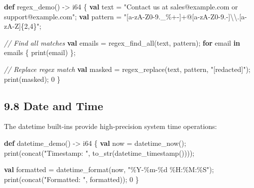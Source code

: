 \documentclass[
  english,
]{book}
\newenvironment{Shaded}{\begin{snugshade}}{\end{snugshade}}
\newcommand{\CommentTok}[1]{\textcolor[rgb]{0.42,0.60,0.33}{\textit{#1}}}
\newcommand{\ControlFlowTok}[1]{\textcolor[rgb]{0.77,0.53,0.75}{\textbf{#1}}}
\newcommand{\DataTypeTok}[1]{\textcolor[rgb]{0.31,0.79,0.69}{#1}}
\newcommand{\DecValTok}[1]{\textcolor[rgb]{0.71,0.81,0.66}{#1}}
\newcommand{\FunctionTok}[1]{\textcolor[rgb]{0.86,0.86,0.67}{#1}}
\newcommand{\KeywordTok}[1]{\textcolor[rgb]{0.34,0.61,0.84}{\textbf{#1}}}
\newcommand{\NormalTok}[1]{\textcolor[rgb]{0.83,0.83,0.83}{#1}}
\newcommand{\OperatorTok}[1]{\textcolor[rgb]{0.83,0.83,0.83}{#1}}
\newcommand{\StringTok}[1]{\textcolor[rgb]{0.81,0.57,0.47}{#1}}
\begin{document}
\begin{Shaded}
\begin{Highlighting}[]
\KeywordTok{def}\NormalTok{ regex\_demo() }\OperatorTok{{-}\textgreater{}} \DataTypeTok{i64}\NormalTok{ \{}
    \KeywordTok{val}\NormalTok{ text }\OperatorTok{=} \StringTok{"Contact us at sales@example.com or support@example.com"}\NormalTok{;}
    \KeywordTok{val}\NormalTok{ pattern }\OperatorTok{=} \StringTok{"[a{-}zA{-}Z0{-}9.\_\%+{-}]+@[a{-}zA{-}Z0{-}9.{-}]\textbackslash{}\textbackslash{}.[a{-}zA{-}Z]\{2,4\}"}\NormalTok{;}
    
    \CommentTok{// Find all matches}
    \KeywordTok{val}\NormalTok{ emails }\OperatorTok{=} \FunctionTok{regex\_find\_all}\NormalTok{(text, pattern);}
    \ControlFlowTok{for}\NormalTok{ email }\ControlFlowTok{in}\NormalTok{ emails \{}
        \FunctionTok{print}\NormalTok{(email)}
\NormalTok{    \};}
    
    \CommentTok{// Replace regex match}
    \KeywordTok{val}\NormalTok{ masked }\OperatorTok{=} \FunctionTok{regex\_replace}\NormalTok{(text, pattern, }\StringTok{"[redacted]"}\NormalTok{);}
    \FunctionTok{print}\NormalTok{(masked);}
    \DecValTok{0}
\NormalTok{\}}
\end{Highlighting}
\end{Shaded}

\subsection{9.8 Date and Time}\label{date-and-time-1}

The datetime built-ins provide high-precision system time operations:

\begin{Shaded}
\begin{Highlighting}[]
\KeywordTok{def}\NormalTok{ datetime\_demo() }\OperatorTok{{-}\textgreater{}} \DataTypeTok{i64}\NormalTok{ \{}
    \KeywordTok{val}\NormalTok{ now }\OperatorTok{=} \FunctionTok{datetime\_now}\NormalTok{();}
    \FunctionTok{print}\NormalTok{(}\FunctionTok{concat}\NormalTok{(}\StringTok{"Timestamp: "}\NormalTok{, }\FunctionTok{to\_str}\NormalTok{(}\FunctionTok{datetime\_timestamp}\NormalTok{())));}
    
    \KeywordTok{val}\NormalTok{ formatted }\OperatorTok{=} \FunctionTok{datetime\_format}\NormalTok{(now, }\StringTok{"\%Y{-}\%m{-}\%d \%H:\%M:\%S"}\NormalTok{);}
    \FunctionTok{print}\NormalTok{(}\FunctionTok{concat}\NormalTok{(}\StringTok{"Formatted: "}\NormalTok{, formatted));}
    \DecValTok{0}
\NormalTok{\}}
\end{Highlighting}
\end{Shaded}
\end{document}
